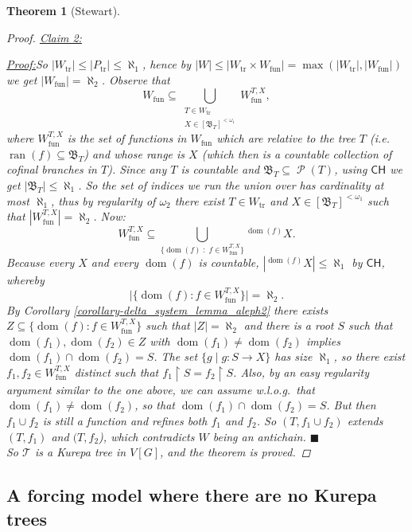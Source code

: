 \documentclass[11pt,a4paper]{report}
\newtheorem{theorem}{Theorem}[chapter] %
\theoremstyle{definition}
\theoremstyle{num.custom-title}
\theoremstyle{custom-title}
\newenvironment{claim}[1]{\par\noindent\underline{Claim#1:}\space}{} %
\newenvironment{claimproof}[1]{\par\noindent\underline{Proof:}\space#1}{\leavevmode\unskip\penalty9999 \hbox{}\nobreak\hfill\quad\hbox{$\blacksquare$}} %
\DeclareMathOperator{\dom}{dom}
\DeclareMathOperator{\ran}{ran}
\DeclareMathOperator{\PP}{\mathcal{P}}
\DeclareMathOperator{\sse}{\subseteq}
\DeclareMathOperator{\restr}{\upharpoonright}
\newcommand{\CH}{\ensuremath{\mathsf{CH}}\xspace}
\newcommand{\T}{\mathcal{T}}
\begin{document}
\begin{theorem}[Stewart]
\begin{proof}
\begin{claim}{ 2}
\begin{claimproof}
So $|W_{\text{tr}}| \leq |P_{\text{tr}}| \leq \aleph_1$, hence by $|W| \leq |W_{\text{tr}} \times W_{\text{fun}}| = \max(|W_{\text{tr}}|,|W_{\text{fun}}|)$ we get $|W_{\text{fun}}| = \aleph_2$. Observe that
\[
W_{\text{fun}} \sse \bigcup_{\substack{T \in W_{\text{tr}} \\ X \in [\mathfrak{B}_T]^{< \omega_1} }} W_{\text{fun}}^{T,X},
\]
where $W_{\text{fun}}^{T,X}$ is the set of functions in $W_{\text{fun}}$ which are relative to the tree $T$ (i.e.\ $\ran(f) \sse \mathfrak{B}_T$) and whose range is $X$ (which then is a countable collection of cofinal branches in $T$). Since any $T$ is countable and $\mathfrak{B}_T \sse \PP(T)$, using \CH we get $|\mathfrak{B}_T| \leq \aleph_1$. So the set of indices we run the union over has cardinality at most $\aleph_1$, thus by regularity of $\omega_2$ there exist $T \in W_{\text{tr}}$ and $X \in [\mathfrak{B}_T]^{< \omega_1}$ such that $|W_{\text{fun}}^{T,X}| = \aleph_2$. Now:
\[
W_{\text{fun}}^{T,X} \sse \bigcup_{ \big\{ {\dom(f)} \; : \; f \in W_{\text{fun}}^{T,X} \big\} } {^{\dom(f)}} X.
\]
Because every $X$ and every $\dom(f)$ is countable, $|{^{\dom(f)}} X| \leq \aleph_1$ by \CH, whereby
\[
\big| \big\{ {\dom(f)} : f \in W_{\text{fun}}^{T,X} \big\} \big| = \aleph_2.
\]
By Corollary \ref{corollary-delta_system_lemma_aleph2} there exists $Z \sse \big\{ {\dom(f)} : f \in W_{\text{fun}}^{T,X} \big\}$ such that $|Z| = \aleph_2$ and there is a root $S$ such that $\dom(f_1), \dom(f_2) \in Z$ with $\dom(f_1) \neq \dom(f_2)$ implies $\dom(f_1) \cap \dom(f_2) = S$. The set $\{g \mid g : S \to X\}$ has size $\aleph_1$, so there exist $f_1,f_2 \in W_{\text{fun}}^{T,X}$ distinct such that $f_1 \restr S = f_2 \restr S$. Also, by an easy regularity argument similar to the one above, we can assume w.l.o.g.\ that $\dom(f_1) \neq \dom(f_2)$, so that $\dom(f_1) \cap \dom(f_2) = S$. But then $f_1 \cup f_2$ is still a function and refines both $f_1$ and $f_2$. So $(T, f_1 \cup f_2)$ extends $(T,f_1)$ and $(T,f_2$), which contradicts $W$ being an antichain.
\end{claimproof}
\end{claim}
\\[6pt]
\indent So $\T$ is a Kurepa tree in $V[G]$, and the theorem is proved.
\end{proof}
\end{theorem}


\subsection{A forcing model where there are no Kurepa trees}
\end{document}

